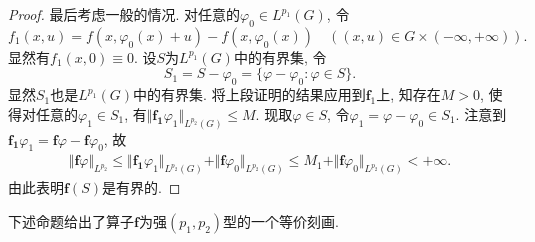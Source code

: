 \begin{proposition}
\begin{proof}
        最后考虑一般的情况. 对任意的$\varphi_0 \in L^{p_1}(G)$, 令 
        \begin{equation*}
            f_1(x, u) = f(x, \varphi_0(x) + u) - f(x, \varphi_0(x)) \quad ((x, u) \in G \times (-\infty, +\infty)).
        \end{equation*}
        显然有$f_1(x, 0) \equiv 0$. 设$S$为$L^{p_1}(G)$中的有界集, 令 
        \begin{equation*}
            S_1 = S - \varphi_0 = \{\varphi - \varphi_0\colon \varphi \in S\}.
        \end{equation*}
        显然$S_1$也是$L^{p_1}(G)$中的有界集. 将上段证明的结果应用到$\bm{f}_1$上, 知存在$M > 0$, 使得对任意的$\varphi_1 \in S_1$, 有$\Vert \bm{f_1}\varphi_1\Vert_{L^{p_2}(G)} \leq M$. 现取$\varphi \in S$, 令$\varphi_1 = \varphi - \varphi_0 \in S_1$. 注意到$\bm{f_1}\varphi_1 = \bm{f}\varphi - \bm{f}\varphi_0$, 故 
        \begin{align*}
            \Vert \bm{f}\varphi\Vert_{L^{p_2}} \leq \Vert \bm{f_1}\varphi_1\Vert_{L^{p_2}(G)} + \Vert \bm{f}\varphi_0\Vert_{L^{p_2}(G)} \leq M_1 + \Vert \bm{f}\varphi_0\Vert_{L^{p_2}(G)} < +\infty. 
        \end{align*}
        由此表明$\bm{f}(S)$是有界的.
    \end{proof}
\end{proposition}

下述命题给出了算子$\bm{f}$为强$(p_1, p_2)$型的一个等价刻画.

